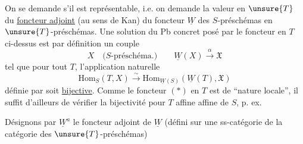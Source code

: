 On  se demande s'il est représentable, i.e. on demande la valeur en $\unsure{T}$ du \uline{foncteur adjoint} (au sens de Kan) du foncteur $\underline W$ des $S$-préschémas en $\unsure{T}$-préschémas. Une solution du Pb concret posé par le foncteur en $T$ ci-dessus est par définition un couple
\[
X\quad\text{($S$-préschéma.)}\qquad \underline W(X)\xrightarrow{\alpha}\mathfrak X
\]
tel que pour tout $T$, l'application naturelle
\[
\mathrm{Hom}_S(T,X)\xrightarrow{\sim}\mathrm{Hom}_{\underline W(S)}(\underline W(T),\mathfrak X)
\]
 définie par 
soit \uline{bijective}. Comme le foncteur $(\ast)$ en $T$ est de ``nature locale'', il suffit d'ailleurs de vérifier la bijectivité pour $T$ affine   affine de $S$, p. ex.

Désignons par $\underline W^a$ le foncteur adjoint de $\underline W$ (défini sur une ss-catégorie de la catégorie des $\unsure{T}$-préschémas)

